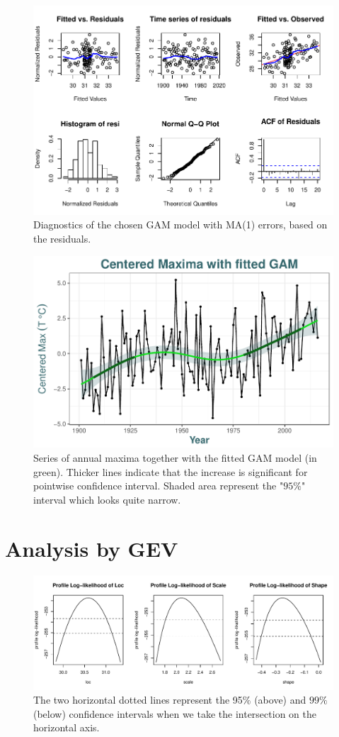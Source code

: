\documentclass[11pt,a4paper,openany ]{book}
\begin{document}
\begin{figure}[!htb]
\centering	\includegraphics[width=.85\linewidth]{diagnogam.pdf}\caption{Diagnostics of the chosen GAM model with MA(1) errors, based on the residuals. }\label{fig:diagnogam}
\end{figure}


\begin{figure}[!htb]
\centering	\includegraphics[width=.7\linewidth]{max_gam.pdf}\caption{Series of annual maxima together with the fitted GAM model (in green). Thicker lines indicate that the increase is significant for pointwise confidence interval. Shaded area represent the "$95\%$" interval which looks quite narrow. }\label{fig:center_gam}
\end{figure}




\section{Analysis by GEV}


\begin{figure}[!htb]
\centering	\includegraphics[width=.85\linewidth]{proflikpar.pdf}\caption{ The two horizontal dotted lines represent the 95$\%$ (above) and $99\%$ (below) confidence intervals when we take the intersection on the horizontal axis. }\label{fig:proflikpar}
\end{figure}
\end{document}
